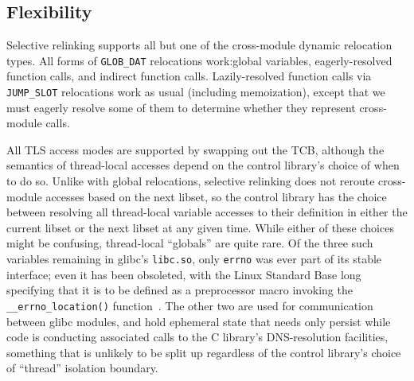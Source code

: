 \subsection{Flexibility}
\label{sec:limits}

Selective relinking supports all but one of the cross-module dynamic relocation
types.  All forms of \texttt{GLOB\_DAT} relocations work:\@ global variables,
eagerly-resolved function calls, and indirect function calls.  Lazily-resolved
function calls via \texttt{JUMP\_SLOT} relocations work as usual (including
memoization), except that we must eagerly resolve some of them to determine
whether they represent cross-module calls.

All TLS access modes are supported by swapping out the TCB, although the semantics of
thread-local accesses depend on the control library's choice of when to do so.
Unlike with global relocations, selective relinking does not reroute cross-module
accesses based on the next libset, so the control library has the choice between
resolving all thread-local variable accesses to their definition in either the
current libset or the next libset at any given time.  While either of these choices
might be confusing, thread-local ``globals'' are quite rare.  Of the three such
variables remaining in glibc's \texttt{libc.so}, only \texttt{errno} was ever part of
its stable interface; even it has been obsoleted, with the Linux Standard Base long
specifying that it is to be defined as a preprocessor macro invoking the
\texttt{\_\_errno\_location()} function~\cite{www-lsb-errno}.  The other two are used
for communication between glibc modules, and hold ephemeral state that needs only
persist while code is conducting associated calls to the C library's DNS-resolution
facilities, something that is unlikely to be split up regardless of the control
library's choice of ``thread'' isolation boundary.

